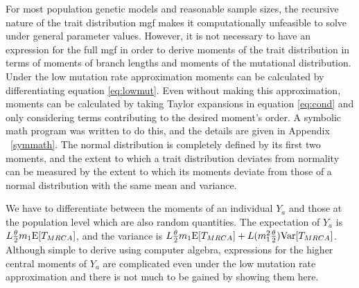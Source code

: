 \newcommand{\AAA}{\E[\mathbbm{T}_{4,4}] + \frac{1}{3}\E[\mathbbm{T}_{3,4}] + \frac{2}{9}\E[\mathbbm{T}_{2,4}]}
\newcommand{\BBB}{\frac{1}{9}\E[\mathbbm{T}_{2,4}] + \frac{1}{6}\E[\mathbbm{T}_{3,4}]}
\newcommand{\CCC}{\E[\mathbbm{T}_{4,4}] - \frac{1}{6}\E[\mathbbm{T}_{3,4}] - \frac{1}{9}\E[\mathbbm{T}_{2,4}]}

For most population genetic models and reasonable sample sizes, the recursive
nature of the trait distribution mgf makes it computationally unfeasible to
solve under general parameter values. However, it is not necessary to have an
expression for the full mgf in order to derive moments of the trait distribution
in terms of moments of branch lengths and moments of the mutational
distribution. Under the low mutation rate approximation moments can be
calculated by differentiating equation \eqref{eq:lowmut}. Even without making
this approximation, moments can be calculated by taking Taylor expansions in
equation \eqref{eq:cond} and only considering terms contributing to the desired
moment's order. A symbolic math program was written to do this, and the details
are given in Appendix ~\ref{symmath}. The normal distribution is completely
defined by its first two moments, and the extent to which a trait distribution
deviates from normality can be measured by the extent to which its moments
deviate from those of a normal distribution with the same mean and variance.

We have to differentiate between the moments of an individual $Y_a$ and those at
the population level which are also random quantities. The expectation of $Y_a$
is $L \frac{\theta}{2} m_1 \mathrm{E}[T_{MRCA}]$, and the variance is $L \frac{\theta}{2} m_1 \mathrm{E}[T_{MRCA}] +
L(m_1^2\frac{\theta}{2})\mathrm{Var}[T_{MRCA}]$. Although simple to derive using computer algebra,
expressions for the higher central moments of $Y_a$ are complicated even under
the low mutation rate approximation and there is not much to be gained by
showing them here.

